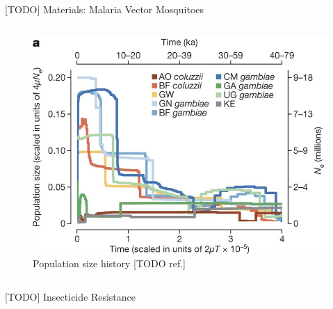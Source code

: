 \documentclass[final,hyperref={pdfpagelabels=false}]{beamer}
\begin{document}
\begin{frame}[t]
\begin{columns}[t]
\begin{column}{.465\textwidth}
\begin{block}{[TODO] Materials: Malaria Vector Mosquitoes}
\begin{columns}
\begin{column}{.6\textwidth}
\begin{figure}
\includegraphics[width=.95\linewidth]{nature-mosquitoes/fig_3a}
\caption{Population size history [TODO ref.]}
\end{figure}

\end{column}

\end{columns} %
\end{block}


\begin{block}{[TODO] Insecticide Resistance}


\end{block}
\end{column}
\end{columns}
\end{frame}
\end{document}
